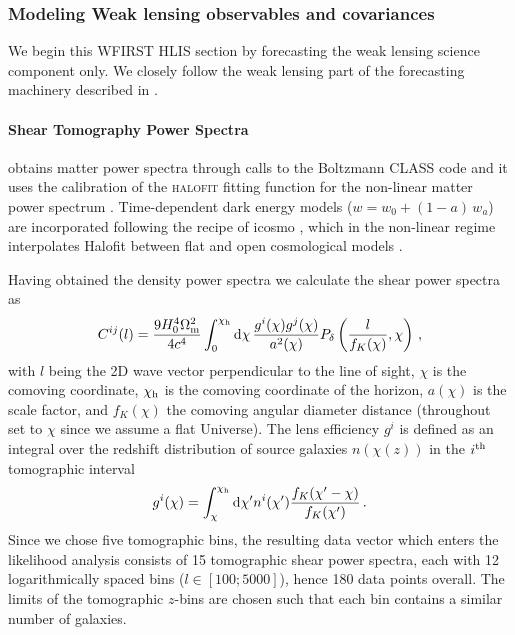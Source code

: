 \subsubsection{Modeling Weak lensing observables and covariances}
\label{sec:lensingbasics}

We begin this WFIRST HLIS section by forecasting the weak lensing science component only. We closely follow the weak lensing part of the forecasting machinery described in \cite{Krause2017}.

\paragraph{Shear Tomography Power Spectra} \CoLi obtains matter power spectra through calls to the Boltzmann \textsc{CLASS} code and it uses the \citet{tsn12} calibration of the \textsc{halofit} fitting function for the non-linear matter power spectrum \citep{smp03}. Time-dependent dark energy models ($w=w_0+(1-a)\,w_a$) are incorporated following the recipe of {\sc icosmo} \citep{rak11}, which in the non-linear regime interpolates Halofit between flat and open cosmological models \citep[also see][for more details]{shj10}.

Having obtained the density power spectra we calculate the shear power spectra as
\begin{equation}
\label{eq:pdeltatopkappa}
C ^{ij} (l) = \frac{9H_0^4 \om^2}{4c^4} \int_0^{\chi_\mr h}
\mr d \chi \, \frac{g^{i}(\chi) g^{j}(\chi)}{a^2(\chi)} \pd \left(\frac{l}{f_K(\chi)},\chi \right) \,,
\end{equation}
with $l$ being the 2D wave vector perpendicular to the line of sight, $\chi$ is the comoving coordinate, $\chi_\mathrm h$ is the comoving coordinate of the horizon, $a(\chi)$ is the scale factor, and $f_K(\chi)$ the comoving angular diameter distance (throughout set to $\chi$ since we assume a flat Universe). The lens efficiency $g^{i}$ is defined as an integral over the redshift distribution of source galaxies $n(\chi(z))$ in the $i^\mathrm{th}$ tomographic interval
\begin{equation}
\label{eq:redshift_distri}
g^{i}(\chi) = \int_\chi^{\chi_{\mr h}} \mr d \chi' n^{i} (\chi') \frac{f_K (\chi'-\chi)}{f_K (\chi')} \,.
\end{equation}
Since we chose five tomographic bins, the resulting data vector which enters the likelihood analysis consists of 15 tomographic shear power spectra, each with 12 logarithmically spaced bins ($l \in [100;5000]$), hence 180 data points overall. The limits of the tomographic $z$-bins are chosen such that each bin contains a similar number of galaxies.


